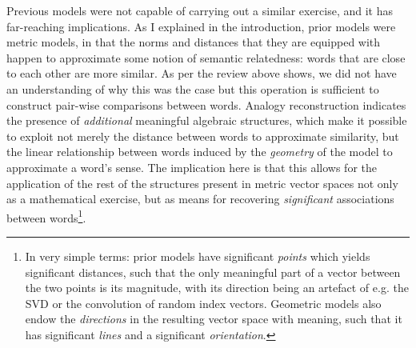 Previous models were not capable of carrying out a similar exercise, and it has far-reaching implications.
As I explained in the introduction, prior models were metric models, in that the norms and distances that they are equipped with happen to approximate some notion of semantic relatedness: words that are close to each other are more similar.
As per the review above shows, we did not have an understanding of why this was the case but this operation is sufficient to construct pair-wise comparisons between words.
Analogy reconstruction indicates the presence of \emph{additional} meaningful algebraic structures, which make it possible to exploit not merely the distance between words to approximate similarity, but the linear relationship between words induced by the \emph{geometry} of the model to approximate a word's sense.
The implication here is that this allows for the application of the rest of the structures present in metric vector spaces not only as a mathematical exercise, but as means for recovering \emph{significant} associations between words\footnote{
    In very simple terms: prior models have significant \emph{points} which yields significant distances, such that the only meaningful part of a vector between the two points is its magnitude, with its direction being an artefact of e.g. the SVD or the convolution of random index vectors.
    Geometric models also endow the \emph{directions} in the resulting vector space with meaning, such that it has significant \emph{lines} and a significant \emph{orientation}.
}.

